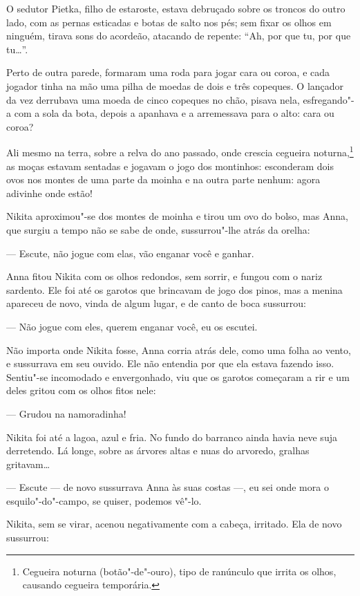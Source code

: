 O sedutor Pietka, filho de estaroste, estava debruçado sobre os troncos
do outro lado, com as pernas esticadas e botas de salto nos pés; sem
fixar os olhos em ninguém, tirava sons do acordeão, atacando de repente:
``Ah, por que tu, por que tu\ldots{}''.

Perto de outra parede, formaram uma roda para jogar cara ou coroa, e
cada jogador tinha na mão uma pilha de moedas de dois e três
copeques. O lançador da vez derrubava uma moeda de cinco copeques no
chão, pisava nela, esfregando"-a com a sola da bota, depois a apanhava e
a arremessava para o alto: cara ou coroa?

Ali mesmo na terra, sobre a relva do ano passado, onde crescia cegueira
noturna,\footnote{Cegueira noturna (botão"-de"-ouro), tipo de ranúnculo
  que irrita os olhos, causando cegueira temporária.} as moças estavam
sentadas e jogavam o jogo dos montinhos: esconderam dois ovos nos montes
de uma parte da moinha e na outra parte nenhum: agora adivinhe onde
estão!

Nikita aproximou"-se dos montes de moinha e tirou um ovo do bolso, mas
Anna, que surgiu a tempo não se sabe de onde, sussurrou"-lhe atrás da
orelha:

--- Escute, não jogue com elas, vão enganar você e ganhar.

Anna fitou Nikita com os olhos redondos, sem sorrir, e fungou com o
nariz sardento. Ele foi até os garotos que brincavam de jogo dos pinos,
mas a menina apareceu de novo, vinda de algum lugar, e de canto de boca
sussurrou:

--- Não jogue com eles, querem enganar você, eu os escutei.

Não importa onde Nikita fosse, Anna corria atrás dele, como uma folha ao
vento, e sussurrava em seu ouvido. Ele não entendia por que ela estava
fazendo isso. Sentiu"-se incomodado e envergonhado, viu que os garotos
começaram a rir e um deles gritou com os olhos fitos nele:

--- Grudou na namoradinha!

Nikita foi até a lagoa, azul e fria. No fundo do barranco ainda havia
neve suja derretendo. Lá longe, sobre as árvores altas e nuas do
arvoredo, gralhas gritavam\ldots{}

--- Escute --- de novo sussurrava Anna às suas costas ---, eu sei onde
mora o esquilo"-do"-campo, se quiser, podemos vê"-lo.

Nikita, sem se virar, acenou negativamente com a cabeça, irritado. Ela
de novo sussurrou:

